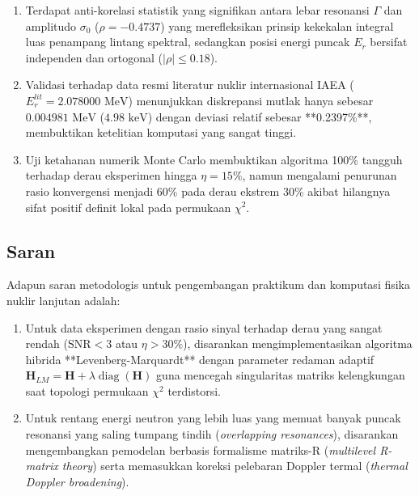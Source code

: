 \begin{enumerate}
    \item Terdapat anti-korelasi statistik yang signifikan antara lebar resonansi $\Gamma$ dan amplitudo $\sigma_0$ ($\rho = -0.4737$) yang merefleksikan prinsip kekekalan integral luas penampang lintang spektral, sedangkan posisi energi puncak $E_r$ bersifat independen dan ortogonal ($|\rho| \le 0.18$).
    \item Validasi terhadap data resmi literatur nuklir internasional IAEA ($E_r^{lit} = 2.078000\text{ MeV}$) menunjukkan diskrepansi mutlak hanya sebesar $0.004981\text{ MeV}$ ($4.98\text{ keV}$) dengan deviasi relatif sebesar **0.2397\%**, membuktikan ketelitian komputasi yang sangat tinggi.
    \item Uji ketahanan numerik Monte Carlo membuktikan algoritma 100\% tangguh terhadap derau eksperimen hingga $\eta = 15\%$, namun mengalami penurunan rasio konvergensi menjadi 60\% pada derau ekstrem 30\% akibat hilangnya sifat positif definit lokal pada permukaan $\chi^2$.
\end{enumerate}

\subsection*{Saran}
Adapun saran metodologis untuk pengembangan praktikum dan komputasi fisika nuklir lanjutan adalah:
\begin{enumerate}
    \item Untuk data eksperimen dengan rasio sinyal terhadap derau yang sangat rendah ($\text{SNR} < 3$ atau $\eta > 30\%$), disarankan mengimplementasikan algoritma hibrida **Levenberg-Marquardt** dengan parameter redaman adaptif $\mathbf{H}_{LM} = \mathbf{H} + \lambda \operatorname{diag}(\mathbf{H})$ guna mencegah singularitas matriks kelengkungan saat topologi permukaan $\chi^2$ terdistorsi.
    \item Untuk rentang energi neutron yang lebih luas yang memuat banyak puncak resonansi yang saling tumpang tindih (\textit{overlapping resonances}), disarankan mengembangkan pemodelan berbasis formalisme matriks-R (\textit{multilevel R-matrix theory}) serta memasukkan koreksi pelebaran Doppler termal (\textit{thermal Doppler broadening}).
\end{enumerate}
